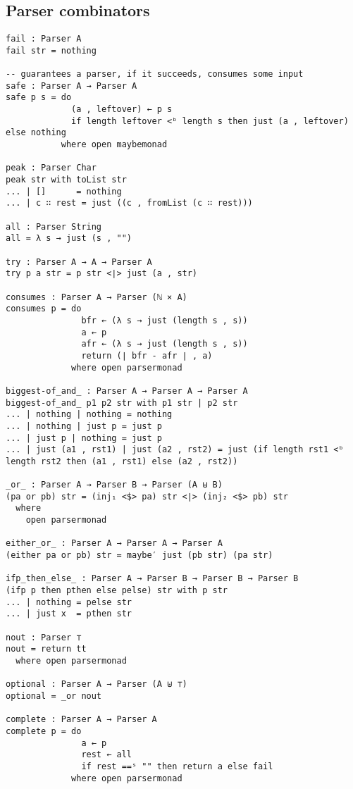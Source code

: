 \begin{appendices}
\section{Parser combinators}
\label{appendix-parsercombinators}

\begin{verbatim}
fail : Parser A
fail str = nothing

-- guarantees a parser, if it succeeds, consumes some input
safe : Parser A → Parser A
safe p s = do
             (a , leftover) ← p s
             if length leftover <ᵇ length s then just (a , leftover) else nothing
           where open maybemonad

peak : Parser Char
peak str with toList str
... | []      = nothing
... | c ∷ rest = just ((c , fromList (c ∷ rest)))

all : Parser String
all = λ s → just (s , "")

try : Parser A → A → Parser A
try p a str = p str <∣> just (a , str)

consumes : Parser A → Parser (ℕ × A)
consumes p = do
               bfr ← (λ s → just (length s , s))
               a ← p
               afr ← (λ s → just (length s , s))
               return (∣ bfr - afr ∣ , a)
             where open parsermonad

biggest-of_and_ : Parser A → Parser A → Parser A
biggest-of_and_ p1 p2 str with p1 str | p2 str
... | nothing | nothing = nothing
... | nothing | just p = just p
... | just p | nothing = just p
... | just (a1 , rst1) | just (a2 , rst2) = just (if length rst1 <ᵇ length rst2 then (a1 , rst1) else (a2 , rst2))

_or_ : Parser A → Parser B → Parser (A ⊎ B)
(pa or pb) str = (inj₁ <$> pa) str <∣> (inj₂ <$> pb) str
  where
    open parsermonad

either_or_ : Parser A → Parser A → Parser A
(either pa or pb) str = maybe′ just (pb str) (pa str)

ifp_then_else_ : Parser A → Parser B → Parser B → Parser B
(ifp p then pthen else pelse) str with p str
... | nothing = pelse str
... | just x  = pthen str

nout : Parser ⊤
nout = return tt
  where open parsermonad

optional : Parser A → Parser (A ⊎ ⊤)
optional = _or nout

complete : Parser A → Parser A
complete p = do
               a ← p
               rest ← all
               if rest ==ˢ "" then return a else fail
             where open parsermonad


\end{verbatim}
\end{appendices}
